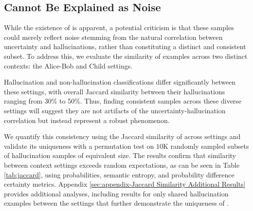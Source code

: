 \subsection{\chk Cannot Be Explained as Noise}\label{sec:Certainty Hallucinations can not be Explain as Noise}
While the existence of \chk is apparent, a potential criticism is that these samples could merely reflect noise stemming from the natural correlation between uncertainty and hallucinations, rather than constituting a distinct and consistent subset. To address this, we evaluate the similarity of \chk examples across two distinct contexts: the Alice-Bob and Child settings. 

Hallucination and non-hallucination classifications 
differ significantly between these settings, with overall Jaccard similarity between their hallucinations ranging from 30\% to 50\%. Thus, finding consistent \chk samples across these diverse settings will suggest they are not artifacts of the uncertainty-hallucination correlation but instead represent a robust phenomenon.

We quantify this consistency using the Jaccard similarity of \chk across settings and validate its uniqueness with a permutation test on $10$K randomly sampled subsets of hallucination samples of equivalent size. The results confirm that \chk similarity between context settings exceeds random expectations, as can be seen in Table \ref{tab:jaccard}, using probabilities, semantic entropy, and probability difference certainty metrics. 
Appendix \ref{sec:appendix-Jaccard Similarity Additional Results} provides additional analyses, including results for only shared hallucination examples between the settings that further demonstrate the uniqueness of \chk.



